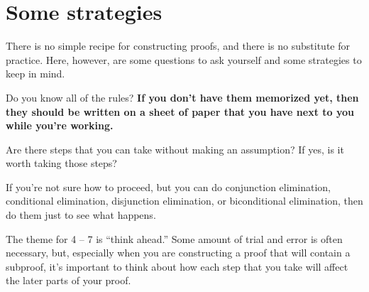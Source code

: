 \chapter{Some strategies}
There is no simple recipe for constructing proofs, and there is no substitute for practice. Here, however, are some questions to ask yourself and some strategies to keep in mind.

\begin{earg}
\item[\ex{18-1}] Do you know all of the rules? \textbf{If you don’t have them memorized yet, then they should be written on a sheet of paper that you have next to you while you’re working.}
\medskip

\item[\ex{18-2}] Are there steps that you can take without making an assumption? If yes, is it worth taking those steps?
\medskip

\item[\ex{18-3}] If you’re not sure how to proceed, but you can do conjunction elimination, conditional elimination, disjunction elimination, or biconditional elimination, then do them just to see what happens.
\end{earg}

\noindent The theme for 4 -- 7 is ``think ahead.'' Some amount of trial and error is often necessary, but, especially when you are constructing a proof that will contain a subproof, it's important to think about how each step that you take will affect the later parts of your proof.

